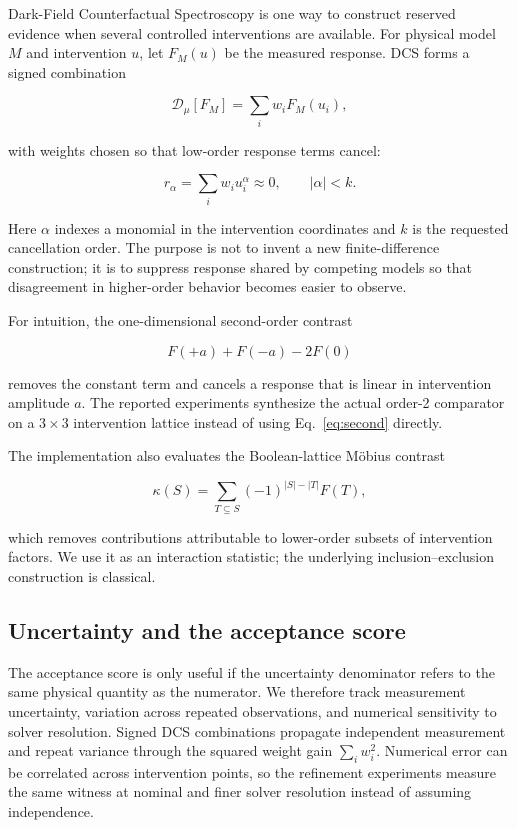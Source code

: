 \documentclass[acmtog]{acmart}
\begin{document}
Dark-Field Counterfactual Spectroscopy is one way to construct reserved evidence when several controlled interventions are available. For physical model \(M\) and intervention \(u\), let \(F_M(u)\) be the measured response. DCS forms a signed combination

\[
\mathcal{D}_{\mu}[F_M]
=
\sum_i w_i F_M(u_i),
\]

with weights chosen so that low-order response terms cancel:

\[
r_\alpha
=
\sum_i w_i u_i^\alpha
\approx 0,
\qquad
|\alpha|<k.
\]

Here \(\alpha\) indexes a monomial in the intervention coordinates and \(k\) is the requested cancellation order. The purpose is not to invent a new finite-difference construction; it is to suppress response shared by competing models so that disagreement in higher-order behavior becomes easier to observe.

For intuition, the one-dimensional second-order contrast

\begin{equation}\label{eq:second}
F(+a)+F(-a)-2F(0)
\end{equation}

removes the constant term and cancels a response that is linear in intervention amplitude \(a\). The reported experiments synthesize the actual order-2 comparator on a \(3\times3\) intervention lattice instead of using Eq.~\ref{eq:second} directly.

The implementation also evaluates the Boolean-lattice Möbius contrast

\[
\kappa(S)
=
\sum_{T\subseteq S}
(-1)^{|S|-|T|}F(T),
\]

which removes contributions attributable to lower-order subsets of intervention factors. We use it as an interaction statistic; the underlying inclusion--exclusion construction is classical.

\subsection{Uncertainty and the acceptance score}\label{uncertainty-and-standardized-separation}

The acceptance score is only useful if the uncertainty denominator refers to the same physical quantity as the numerator. We therefore track measurement uncertainty, variation across repeated observations, and numerical sensitivity to solver resolution. Signed DCS combinations propagate independent measurement and repeat variance through the squared weight gain \(\sum_i w_i^2\). Numerical error can be correlated across intervention points, so the refinement experiments measure the same witness at nominal and finer solver resolution instead of assuming independence.
\end{document}
